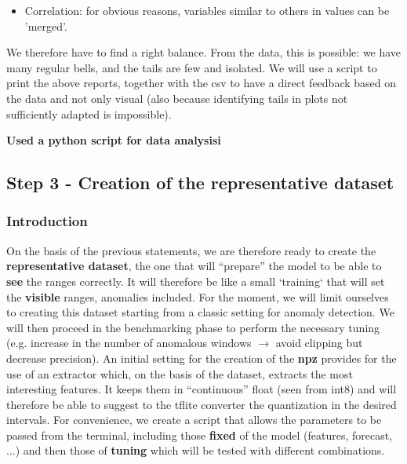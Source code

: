 \begin{itemize}
\begin{itemize}
        \item Obviously they must be included without exaggerating: this is because quantization works with rounding to the nearest number. The more you widen the space, the more precision you lose. For example if I have to represent a range 0–10 in a quantized 0–5, and normally the values oscillate between 2, 3 and 4, sometimes 9 (anomaly), I have to be careful not to widen. If 2 drops to 0q, 3 drops to 1q, and 4 drops to 2q $\rightarrow$ 9 is mapped to 4q $\rightarrow$ OK perfect. If I widen too much because I want to highlight how far 7 is from 4, then I risk: 2 drops to 0q, 3 drops to 0q \textbf{AGAIN}, ... with one bit I represent two different values. I lose precision where the bell is \textit{normal}.
    \end{itemize}
    \item Correlation: for obvious reasons, variables similar to others in values can be 'merged'.
\end{itemize}
We therefore have to find a right balance. From the data, this is possible: we have many regular bells, and the tails are few and isolated. We will use a script to print the above reports, together with the csv to have a direct feedback based on the data and not only visual (also because identifying tails in plots not sufficiently adapted is impossible).

\begin{center}
    \textbf{Used a python script for data analysisi}
\end{center}

\subsection{Step 3 - Creation of the representative dataset}

\subsubsection{Introduction}
On the basis of the previous statements, we are therefore ready to create the \textbf{representative dataset}, the one that will ``prepare'' the model to be able to \textbf{see} the ranges correctly. It will therefore be like a small `training` that will set the \textbf{visible} ranges, anomalies included. For the moment, we will limit ourselves to creating this dataset starting from a classic setting for anomaly detection. We will then proceed in the benchmarking phase to perform the necessary tuning (e.g. increase in the number of anomalous windows $\rightarrow$ avoid clipping but decrease precision).
An initial setting for the creation of the \textbf{npz} provides for the use of an extractor which, on the basis of the dataset, extracts the most interesting features. It keeps them in ``continuous'' float (seen from int8) and will therefore be able to suggest to the tflite converter the quantization in the desired intervals.
For convenience, we create a script that allows the parameters to be passed from the terminal, including those \textbf{fixed} of the model (features, forecast, ...) and then those of \textbf{tuning} which will be tested with different combinations.

